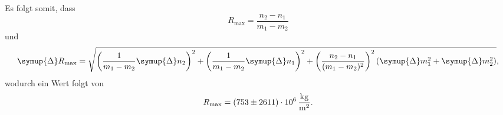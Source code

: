 Es folgt somit, dass
\begin{equation}
    R_\text{max} = \frac{n_2-n_1}{m_1-m_2}
\end{equation}
und
\begin{equation}
    \symup{\Delta}R_\text{max} = \sqrt{
        \left( \frac{1}{m_1-m_2}\symup{\Delta}n_2 \right) ^2 +
        \left( \frac{1}{m_1-m_2}\symup{\Delta}n_1 \right) ^2 +
        \left( \frac{n_2-n_1}{(m_1-m_2)^2}\right) ^2 \left(\symup{\Delta}m_1^2 + \symup{\Delta}m_2^2 \right)
        },
\end{equation}
wodurch ein Wert folgt von
\begin{equation}
    R_\text{max} = \SI{753\pm2611e6}{\kg\per\meter\squared}.
\end{equation}
